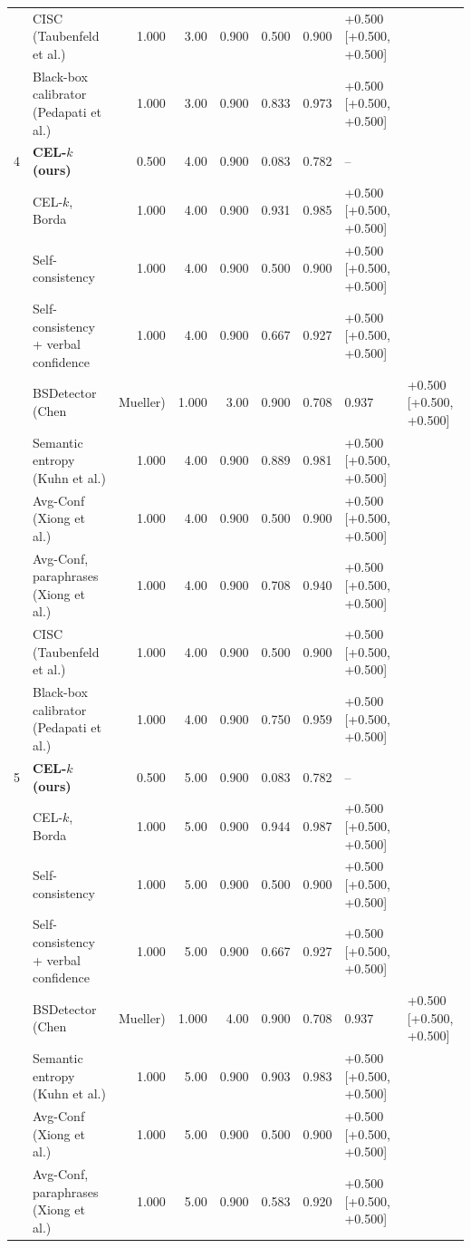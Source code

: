 \begin{table}[t]
\begin{tabular}{llrrrrrl}
 & CISC (Taubenfeld et al.) & 1.000 & 3.00 & 0.900 & 0.500 & 0.900 & +0.500 [+0.500, +0.500] \\
 & Black-box calibrator (Pedapati et al.) & 1.000 & 3.00 & 0.900 & 0.833 & 0.973 & +0.500 [+0.500, +0.500] \\
4 & \textbf{CEL-$k$ (ours)} & 0.500 & 4.00 & 0.900 & 0.083 & 0.782 & -- \\
 & \quad CEL-$k$, Borda & 1.000 & 4.00 & 0.900 & 0.931 & 0.985 & +0.500 [+0.500, +0.500] \\
 & Self-consistency & 1.000 & 4.00 & 0.900 & 0.500 & 0.900 & +0.500 [+0.500, +0.500] \\
 & Self-consistency + verbal confidence & 1.000 & 4.00 & 0.900 & 0.667 & 0.927 & +0.500 [+0.500, +0.500] \\
 & BSDetector (Chen & Mueller) & 1.000 & 3.00 & 0.900 & 0.708 & 0.937 & +0.500 [+0.500, +0.500] \\
 & Semantic entropy (Kuhn et al.) & 1.000 & 4.00 & 0.900 & 0.889 & 0.981 & +0.500 [+0.500, +0.500] \\
 & Avg-Conf (Xiong et al.) & 1.000 & 4.00 & 0.900 & 0.500 & 0.900 & +0.500 [+0.500, +0.500] \\
 & Avg-Conf, paraphrases (Xiong et al.) & 1.000 & 4.00 & 0.900 & 0.708 & 0.940 & +0.500 [+0.500, +0.500] \\
 & CISC (Taubenfeld et al.) & 1.000 & 4.00 & 0.900 & 0.500 & 0.900 & +0.500 [+0.500, +0.500] \\
 & Black-box calibrator (Pedapati et al.) & 1.000 & 4.00 & 0.900 & 0.750 & 0.959 & +0.500 [+0.500, +0.500] \\
5 & \textbf{CEL-$k$ (ours)} & 0.500 & 5.00 & 0.900 & 0.083 & 0.782 & -- \\
 & \quad CEL-$k$, Borda & 1.000 & 5.00 & 0.900 & 0.944 & 0.987 & +0.500 [+0.500, +0.500] \\
 & Self-consistency & 1.000 & 5.00 & 0.900 & 0.500 & 0.900 & +0.500 [+0.500, +0.500] \\
 & Self-consistency + verbal confidence & 1.000 & 5.00 & 0.900 & 0.667 & 0.927 & +0.500 [+0.500, +0.500] \\
 & BSDetector (Chen & Mueller) & 1.000 & 4.00 & 0.900 & 0.708 & 0.937 & +0.500 [+0.500, +0.500] \\
 & Semantic entropy (Kuhn et al.) & 1.000 & 5.00 & 0.900 & 0.903 & 0.983 & +0.500 [+0.500, +0.500] \\
 & Avg-Conf (Xiong et al.) & 1.000 & 5.00 & 0.900 & 0.500 & 0.900 & +0.500 [+0.500, +0.500] \\
 & Avg-Conf, paraphrases (Xiong et al.) & 1.000 & 5.00 & 0.900 & 0.583 & 0.920 & +0.500 [+0.500, +0.500] \\

\end{tabular}
\end{table}
